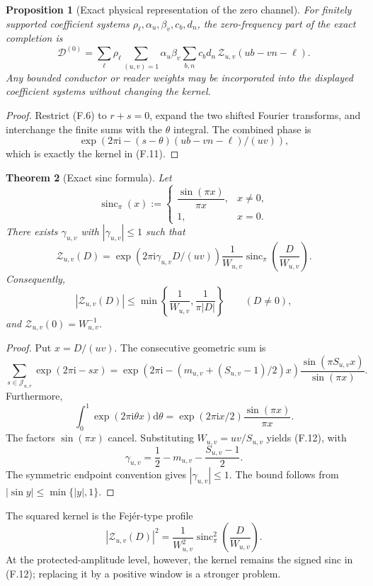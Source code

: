 \documentclass[11pt]{article}
\newtheorem{theorem}{Theorem}[section]
\newtheorem{proposition}[theorem]{Proposition}
\theoremstyle{definition}
\theoremstyle{remark}
\newcommand{\dd}{\mathrm d}
\newcommand{\ee}[1]{\exp(2\pi\mathrm i #1)}
\begin{document}
\begin{proposition}[Exact physical representation of the zero channel]
\label{prop:freq-zero-physical}
For finitely supported coefficient systems
$\rho_\ell,\alpha_u,\beta_v,c_b,d_n$, the zero-frequency part of the exact
completion is
\[
 \boxed{
 \mathscr D^{(0)}
 =\sum_{\ell}\rho_\ell
  \sum_{(u,v)=1}\alpha_u\beta_v
  \sum_{b,n}c_bd_n\,
  \mathscr Z_{u,v}(ub-vn-\ell).}
 \tag{F.11a}
\]
Any bounded conductor or reader weights may be incorporated into the displayed
coefficient systems without changing the kernel.
\end{proposition}

\begin{proof}
Restrict \textup{(F.6)} to $r+s=0$, expand the two shifted Fourier transforms,
and interchange the finite sums with the $\theta$ integral.  The combined
phase is
\[
 \ee{-(s-\theta)(ub-vn-\ell)/(uv)},
\]
which is exactly the kernel in \textup{(F.11)}.
\end{proof}

\begin{theorem}[Exact sinc formula]
\label{thm:freq-sinc}
Let
\[
 \operatorname{sinc}_\pi(x)
 :=\begin{cases}
 \dfrac{\sin(\pi x)}{\pi x},&x\ne0,\\[0.8em]
 1,&x=0.
 \end{cases}
\]
There exists $\gamma_{u,v}$ with $|\gamma_{u,v}|\le1$ such that
\[
 \boxed{
 \mathscr Z_{u,v}(D)
 =\ee{\gamma_{u,v}D/(uv)}
  \frac1{W_{u,v}}
  \operatorname{sinc}_\pi\!\left(\frac D{W_{u,v}}\right).}
 \tag{F.12}
\]
Consequently,
\[
 \boxed{
 |\mathscr Z_{u,v}(D)|
 \le\min\left\{\frac1{W_{u,v}},\frac1{\pi|D|}\right\}}
 \qquad(D\ne0),
 \tag{F.13}
\]
and $\mathscr Z_{u,v}(0)=W_{u,v}^{-1}$.
\end{theorem}

\begin{proof}
Put $x=D/(uv)$.  The consecutive geometric sum is
\[
 \sum_{s\in\mathcal J_{u,v}}\ee{-sx}
 =\ee{-(m_{u,v}+(S_{u,v}-1)/2)x}
   \frac{\sin(\pi S_{u,v}x)}{\sin(\pi x)}.
\]
Furthermore,
\[
 \int_0^1\ee{\theta x}\dd\theta
 =\ee{x/2}\frac{\sin(\pi x)}{\pi x}.
\]
The factors $\sin(\pi x)$ cancel.  Substituting
$W_{u,v}=uv/S_{u,v}$ yields \textup{(F.12)}, with
\[
 \gamma_{u,v}
 =\frac12-m_{u,v}-\frac{S_{u,v}-1}{2}.
\]
The symmetric endpoint convention gives $|\gamma_{u,v}|\le1$.  The bound
follows from $|\sin y|\le\min\{|y|,1\}$.
\end{proof}

The squared kernel is the Fej\'er-type profile
\[
 |\mathscr Z_{u,v}(D)|^2
 =\frac1{W_{u,v}^2}
  \operatorname{sinc}_\pi^2\!\left(\frac D{W_{u,v}}\right).
 \tag{F.14}
\]
At the protected-amplitude level, however, the kernel remains the signed sinc
in \textup{(F.12)}; replacing it by a positive window is a stronger problem.
\end{document}
